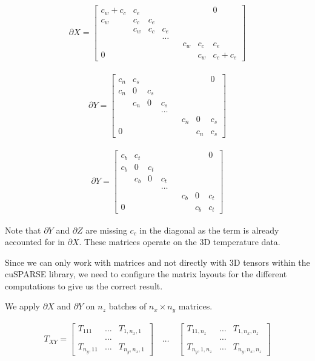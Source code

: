 \begin{align}
    \partial X =
    \begin{bmatrix}
    c_w + c_c   &c_e    &&&&&&0 \\
    c_w     &c_c   &c_e \\
    &c_w    &c_c    &c_e \\
    &&&\ldots \\
    &&&&&c_w    &c_c   &c_e \\
    0&&&&&&c_w   &c_c + c_e
    \end{bmatrix}
\end{align}

\begin{align}
    \partial Y =
    \begin{bmatrix}
    c_n   &c_s    &&&&&&0 \\
    c_n     &0   &c_s \\
    &c_n    &0    &c_s \\
    &&&\ldots \\
    &&&&&c_n    &0   &c_s \\
    0&&&&&&c_n   &c_s
    \end{bmatrix}
\end{align}

\begin{align}
    \partial Y =
    \begin{bmatrix}
    c_b   &c_t    &&&&&&0 \\
    c_b     &0   &c_t \\
    &c_b    &0    &c_t \\
    &&&\ldots \\
    &&&&&c_b    &0   &c_t \\
    0&&&&&&c_b   &c_t
    \end{bmatrix}
\end{align}

Note that \(\partial Y\) and \(\partial Z\) are missing \(c_c\) in the
diagonal as the term is already accounted for in \(\partial X\). These
matrices operate on the 3D temperature data.

Since we can only work with matrices and not directly with 3D tensors
within the cuSPARSE library, we need to configure the matrix layouts for
the different computations to give us the correct result.

We apply \(\partial X\) and \(\partial Y\) on \(n_z\) batches of
\(n_x \times n_y\) matrices.

\begin{align}
    T_{XY} =
    \begin{bmatrix}
    T_{111} &\ldots &T_{1,n_x,1} \\
    &\ldots \\
    T_{n_y,11} &\ldots & T_{n_y,n_x,1}
    \end{bmatrix}
    \quad
    \ldots
    \quad
    \begin{bmatrix}
    T_{11,n_z} &\ldots &T_{1,n_x,n_z} \\
    &\ldots \\
    T_{n_y,1,n_z} &\ldots & T_{n_y,n_x,n_z}
    \end{bmatrix}
\end{align}

